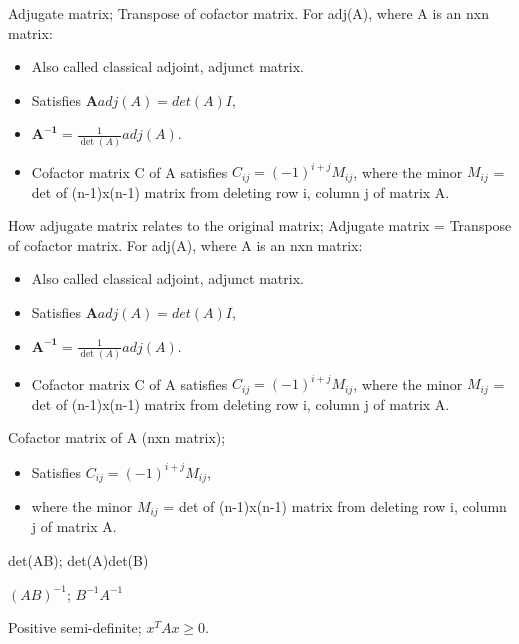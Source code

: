 


Adjugate matrix; Transpose of cofactor matrix. For adj(A), where A is an nxn matrix: \begin{itemize} \item Also called classical adjoint, adjunct matrix.  \item Satisfies $\mathbf{A}adj(A)=det(A)I$, \item $\mathbf{A^{-1}}=\frac{1}{\det(A)}adj(A)$.  \item Cofactor matrix C of A satisfies $C_{ij}=(-1)^{i+j}M_{ij}$, where the minor $M_{ij}$ = det of (n-1)x(n-1) matrix from deleting row i, column j of matrix A.  \end{itemize}

How adjugate matrix relates to the original matrix; Adjugate matrix = Transpose of cofactor matrix. For adj(A), where A is an nxn matrix: \begin{itemize} \item Also called classical adjoint, adjunct matrix. \item Satisfies $\mathbf{A}adj(A)=det(A)I$, \item $\mathbf{A^{-1}}=\frac{1}{\det(A)}adj(A)$. \item Cofactor matrix C of A satisfies $C_{ij}=(-1)^{i+j}M_{ij}$, where the minor $M_{ij}$ = det of (n-1)x(n-1) matrix from deleting row i, column j of matrix A. \end{itemize}

Cofactor matrix of A (nxn matrix); \begin{itemize} \item Satisfies $C_{ij}=(-1)^{i+j}M_{ij}$, \item where the minor $M_{ij}$ = det of (n-1)x(n-1) matrix from deleting row i, column j of matrix A.  \end{itemize}

det(AB); det(A)det(B)

$(AB)^{-1}$; $B^{-1}A^{-1}$

Positive semi-definite; $x^TAx\geq 0$.


